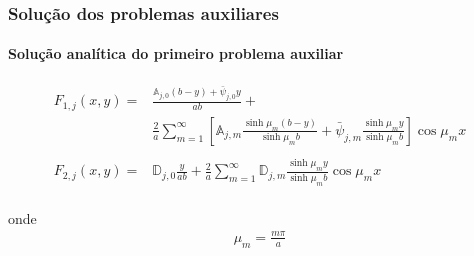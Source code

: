 \documentclass{beamer}
\begin{document}
\begin{frame}
\begin{columns}
\begin{column}{.5\textwidth}
\begin{figure}[t]
\begin{center}
				\end{center}
			\end{figure}
		\end{column}
	\end{columns}
\end{frame}

\begin{frame}
	\frametitle{Solução dos problemas auxiliares}
	\framesubtitle{Solução analítica do primeiro problema auxiliar}
	
	\begin{alertblock}{}
		\begin{align*}
		F_{1, j}(x, y) = & \frac{\mathbb{A}_{j,0}(b - y) + \bar{\psi}_{j,0}y}{ab} + \nonumber \\
		&\frac{2}{a}\sum_{m=1}^\infty\left[\mathbb{A}_{j,m}\frac{\sinh\mu_m (b - y)}{\sinh\mu_m b} + \bar{\psi}_{j, m}\frac{\sinh\mu_m y}{\sinh\mu_m b}\right]\cos\mu_m x \\ \\
		F_{2, j}(x, y) = & \mathbb{D}_{j,0}\frac{y}{ab}  + \frac{2}{a}\sum_{m=1}^\infty\mathbb{D}_{j,m}\frac{\sinh\mu_m y}{\sinh\mu_m b} \cos\mu_m x \\
		\end{align*}
	\end{alertblock}	
	
	onde
	\begin{align*}
	\mu_m = \frac{m \pi}{a}
	\end{align*}
	
\end{frame}
\end{document}
